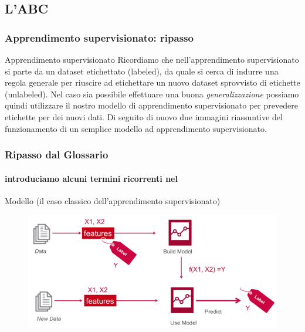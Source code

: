 \subsection[L'ABC]{L'ABC}

\begin{frame}
	
	\frametitle{Apprendimento supervisionato: ripasso}
	
	\begin{block}{Apprendimento supervisionato}
		Ricordiamo che nell'apprendimento supervisionato si parte da un dataset etichettato (labeled), da quale si cerca di indurre una regola generale per riuscire ad etichettare un nuovo dataset sprovvisto di etichette (unlabeled).
		\newlinedouble
		Nel caso sia possibile effettuare una buona \textit{generalizzazione} possiamo quindi utilizzare il nostro modello di apprendimento supervisionato per prevedere etichette per dei nuovi dati.
		\newlinedouble
		Di seguito di nuovo due immagini riassuntive del funzionamento di un semplice modello ad apprendimento supervisionato.
	\end{block}

\end{frame}



\begin{frame}
	
	\frametitle{Ripasso dal Glossario}
	\framesubtitle{introduciamo alcuni termini ricorrenti nel \ml}
	
	\begin{block}{Modello (il caso classico dell'apprendimento supervisionato)}
		\begin{figure}[!htbp]
			\centering
			\includegraphics[width=12cm]{images/glossary/supervised_learning_1.png}
		\end{figure}
		
	\end{block}

\end{frame}


